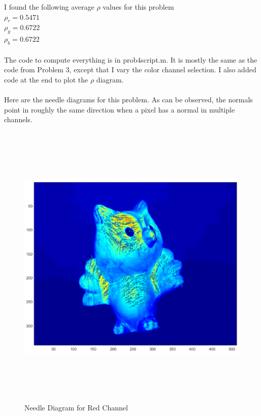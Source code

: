 \documentclass[11pt,psfig]{article}
\begin{document}
I found the following average $\rho$ values for this problem\\
$\rho_r = 0.5471$\\
$\rho_g = 0.6722$\\
$\rho_b = 0.6722$\\
\\
The code to compute everything is in prob4script.m. It is mostly the same as the code from Problem 3, except that I vary the color channel selection. I also added code at the end to plot the $\rho$ diagram.\\
\\
Here are the needle diagrams for this problem. As can be observed, the normals point in roughly the same direction when a pixel has a normal in multiple channels. 
\begin{figure}[H]
\centering
\includegraphics[height=5.5in]{prob4needlePlot1.png}
\caption{Needle Diagram for Red Channel}
\end{figure}
\end{document}
